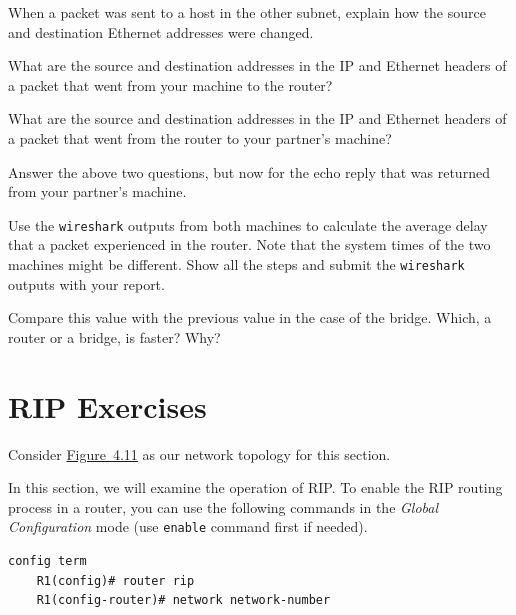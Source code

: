 \documentclass{UTNetLab}
\begin{document}
    \begin{report}
    \item When a packet was sent to a host in the other subnet, explain how the source and destination Ethernet addresses were changed.
    
    \item What are the source and destination addresses in the IP and Ethernet headers of a packet that went from your machine to the router?
    
    \item What are the source and destination addresses in the IP and Ethernet headers of a packet that went from the router to your partner’s machine?
    
    \item Answer the above two questions, but now for the echo reply that was returned from your partner’s machine.

    \item Use the \lstinline{wireshark} outputs from both machines to calculate the average delay that a packet experienced in the router. Note that the system times of the two machines might be different. Show all the steps and submit the \lstinline{wireshark} outputs with your report.
    
    \item Compare this value with the previous value in the case of the bridge. Which, a router or a bridge, is faster? Why?
    \end{report}

\part{RIP Exercises}\label{sec:rip}
   
    Consider \hyperref[fig:4.11]{Figure~4.11} as our network topology for this section.
    
    In this section, we will examine the operation of RIP. To enable the RIP routing process in a router, you can use the following commands in the \textit{Global Configuration} mode (use \lstinline[language={cisco}]{enable} command first if needed).
  
    \begin{lstlisting}[frame=trBL,language={cisco}]
    config term
    R1(config)# router rip
    R1(config-router)# network network-number
    \end{lstlisting}
     
\end{document}
